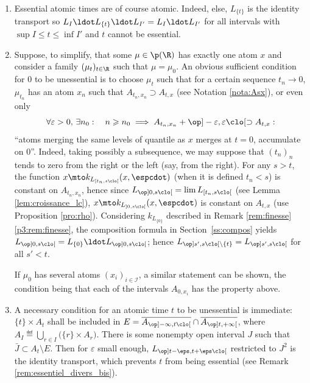 \pagebreak[2]
\skpt
\begin{rem}\label{rem:essentiel_divers}
\begin{enumerate}
\item
Essential atomic times are of course atomic. Indeed, else, $L_{\{t\}}$ is the identity transport so $L_I\ldot L_{\{t\}}{}\ldot L_{I'}=L_I\ldot L_{I'}$ for all intervals with $\sup I\leqslant t \leqslant \inf I'$ and $t$ cannot be essential.

\item
\label{item:suffisante} Suppose, to simplify, that some $\mu\in\p(\R)$ has exactly one atom $x$ and consider a family $(\mu_t)_{t\in\R}$ such that $\mu=\mu_0$. An obvious sufficient condition for $0$ to be unessential is to choose $\mu_t$ such that for a certain sequence $t_n\to0$, $\mu_{t_n}$ has an atom $x_n$ such that $A_{t_n,x_n}\supset A_{t,x}$ (see Notation \ref{nota:Asx}), or even only
\[
\forall \varepsilon>0,\,\exists n_0:\quad n\geqslant n_0\implies A_{t_n,x_n}+\op]-\varepsilon,\varepsilon\clo[\supset A_{t,x}:
\]
``atoms merging the same levels of quantile as $x$ merges at $t=0$, accumulate on $0$''. Indeed, taking possibly a subsequence, we may suppose that $(t_n)_n$ tends to zero from the right or the left (say, from the right). For any $s>t$, the function $x\mto k_{L_{[t_n,s\clo[}}(x,\espcdot)$ (when it is defined \ie $t_n<s$) is constant on $A_{t_n,x_n}$, hence since $L_{\op]0,s\clo[}=\lim L_{[t_n,s\clo[}$ (see Lemma \ref{lem:croissance_lc}), $x\mto k_{L_{]0,s\clo[}}(x,\espcdot)$ is constant on $A_{t,x}$ (use Proposition \ref{pro:rho}). Considering $k_{L_{\{0\}}}$ described in Remark \ref{rem:finesse}\eqref{p3:rem:finesse}, the composition formula in Section~\ref{ss:compos} yields $L_{\op]0,s\clo[}=L_{\{0\}}{}\ldot L_{\op]0,s\clo[}$; hence $L_{\op]s',s\clo[\setminus\{t\}}=L_{\op]s',s\clo[}$ for all $s'<t$.

If $\mu_0$ has several atoms $(x_i)_{i\in\mathcal{I}}$, a similar statement can be shown, the condition being that each of the intervals $A_{0,x_i}$ has the property above.

\item
\label{item:necessaire} A necessary condition for an atomic time $t$ to be unessential is immediate: $\{t\}\times A_{t}$ shall be included in $E=\overline{A_{\op]-\infty,t\clo[}}\cap\overline{A_{\op]t,+\infty[}}$, where $A_{I}\eqdef\bigcup_{r\in I}\bigl(\{r\}\times A_{r}\bigr)$. There is some nonempty open interval $J$ such that $\bar{J}\subset A_t\setminus E$. Then for $\varepsilon$ small enough, $L_{\op]t-\eps,t+\eps\clo[}$ restricted to $J^2$ is the identity transport, which prevents $t$ from being essential (see Remark \ref{rem:essentiel_divers_bis}).


\end{enumerate}
\end{rem}
